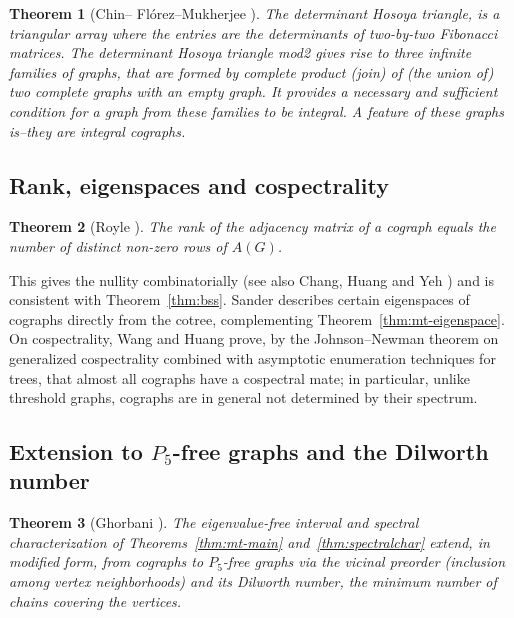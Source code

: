 \documentclass[11pt]{article}
\theoremstyle{plain}
\newtheorem{theorem}{Theorem}[section]
\theoremstyle{definition}
\theoremstyle{remark}
\begin{document}
	\begin{theorem}[Chin-- Fl\'orez--Mukherjee \cite{Ching2020}]
		The determinant Hosoya triangle, is a triangular array where the entries are the determinants of
		two-by-two Fibonacci matrices. The determinant Hosoya triangle mod2 gives rise to three infinite families of graphs, that are formed by complete product (join) of (the union of) two complete graphs with an empty
		graph. It provides a necessary and sufficient condition for a graph from these families to be integral. A feature of these graphs is--they are integral cographs.
		
	\end{theorem}
	
	
	
	\subsection{Rank, eigenspaces and cospectrality}
	\label{sec:rank}
	
	\begin{theorem}[Royle \cite{Royle2003}]
		\label{thm:royle}
		The rank of the adjacency matrix of a cograph equals the number of distinct non-zero rows of $A(G)$.
	\end{theorem}
	
	This gives the nullity combinatorially (see also Chang, Huang and Yeh \cite{ChangHuangYeh2008}) and is consistent with Theorem~\ref{thm:bss}. Sander \cite{Sander2008} describes certain eigenspaces of cographs directly from the cotree, complementing Theorem~\ref{thm:mt-eigenspace}. On cospectrality, Wang and Huang \cite{WangHuang2025} prove, by the Johnson--Newman theorem on generalized cospectrality combined with asymptotic enumeration techniques for trees, that almost all cographs have a cospectral mate; in particular, unlike threshold graphs, cographs are in general not determined by their spectrum.
	
	\subsection{Extension to \texorpdfstring{$P_5$}{P5}-free graphs and the Dilworth number}
	\label{sec:p5free}
	
	\begin{theorem}[Ghorbani \cite{Ghorbani2019p5}]
		\label{thm:ghorbani-p5}
		The eigenvalue-free interval and spectral characterization of Theorems~\ref{thm:mt-main} and~\ref{thm:spectralchar} extend, in modified form, from cographs to $P_5$-free graphs via the \emph{vicinal preorder} (inclusion among vertex neighborhoods) and its \emph{Dilworth number}, the minimum number of chains covering the vertices.
	\end{theorem}
	
\end{document}
